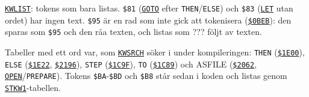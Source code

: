 \begin{Listing}
\Gap
\begin{Cmt}\par\noindent \hyperlink{l:KWLIST}{\texttt{KWLIST}}: tokens som bara listas. \texttt{\$81} (\hyperlink{l:GOTO}{\texttt{GOTO}} efter \texttt{THEN}/\texttt{ELSE}) och \texttt{\$83} (\hyperlink{l:LET}{\texttt{LET}} utan ordet) har ingen text. \texttt{\$95} är en rad som inte gick att tokenisera (\hyperlink{a:0BEB}{\texttt{\$0BEB}}): den sparas som \texttt{\$95} och den råa texten, och listas som {}??? {} följt av texten.\par\end{Cmt}
\Gap
\begin{Cmt}\par\noindent Tabeller med ett ord var, som \hyperlink{l:KWSRCH}{\texttt{KWSRCH}} söker i under kompileringen: \texttt{THEN} (\hyperlink{a:1E00}{\texttt{\$1E00}}), \texttt{ELSE} (\hyperlink{a:1E22}{\texttt{\$1E22}}, \hyperlink{a:2196}{\texttt{\$2196}}), \texttt{STEP} (\hyperlink{a:1C9F}{\texttt{\$1C9F}}), \texttt{TO} (\hyperlink{a:1C89}{\texttt{\$1C89}}) och ASFILE (\hyperlink{a:2062}{\texttt{\$2062}}, \hyperlink{l:OPEN}{\texttt{OPEN}}/\texttt{PREPARE}). Tokens \texttt{\$BA}-\texttt{\$BD} och \texttt{\$B8} står sedan i koden och listas genom \hyperlink{l:STKW1}{\texttt{STKW1}}-tabellen.\par\end{Cmt}

\end{Listing}
